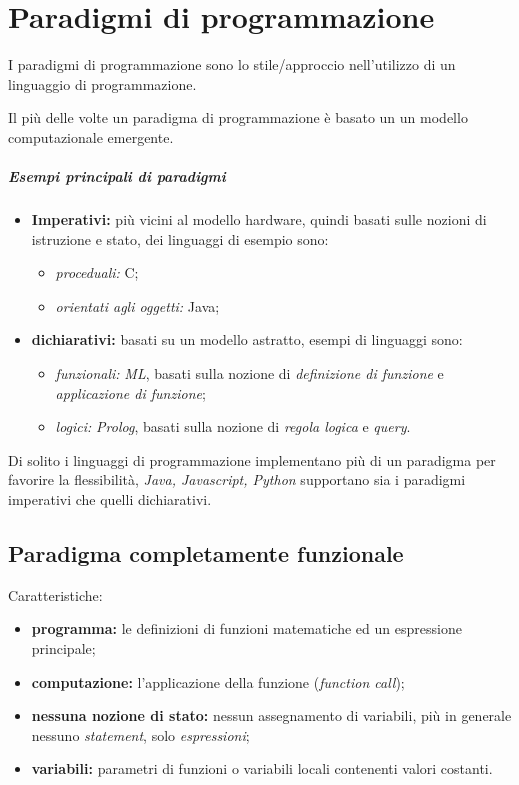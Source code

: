 \chapter{Paradigmi di programmazione}
\begin{theorem}
  I paradigmi di programmazione sono lo stile/approccio nell'utilizzo di un
  linguaggio di programmazione.
\end{theorem}

Il più delle volte un paradigma di programmazione è basato un un modello
computazionale emergente.

\paragraph{Esempi principali di paradigmi}
\begin{itemize}
  \item \textbf{Imperativi:} più vicini al modello hardware, quindi basati
    sulle nozioni di istruzione e stato, dei linguaggi di esempio sono:
    \begin{itemize}
      \item \textit{proceduali:} C;
      \item \textit{orientati agli oggetti:} Java;
    \end{itemize}
  \item \textbf{dichiarativi:} basati su un modello astratto, esempi di
    linguaggi sono:
    \begin{itemize}
      \item \textit{funzionali:} \emph{ML}, basati sulla nozione di
        \emph{definizione di funzione} e \emph{applicazione di funzione};
      \item \textit{logici:} \emph{Prolog}, basati sulla nozione di \emph{
        regola logica} e \emph{query}.
    \end{itemize}
\end{itemize}

Di solito i linguaggi di programmazione implementano più di un paradigma per
favorire la flessibilità, \emph{Java, Javascript, Python} supportano sia
i paradigmi imperativi che quelli dichiarativi.

\section{Paradigma completamente funzionale}
Caratteristiche:
\begin{itemize}
  \item \textbf{programma:} le definizioni di funzioni matematiche ed un
    espressione principale;
  \item \textbf{computazione:} l'applicazione della funzione (\emph{function
    call});
  \item \textbf{nessuna nozione di stato:} nessun assegnamento di variabili,
    più in generale nessuno \emph{statement}, solo \emph{espressioni};
  \item \textbf{variabili:} parametri di funzioni o variabili locali
    contenenti valori costanti.
\end{itemize}


